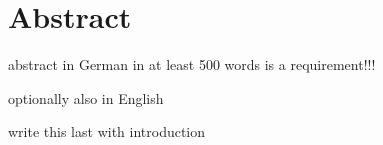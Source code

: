 \section*{Abstract}

\begin{notes}
    abstract in German in at least 500 words is a requirement!!!

    optionally also in English

    write this last with introduction
\end{notes}